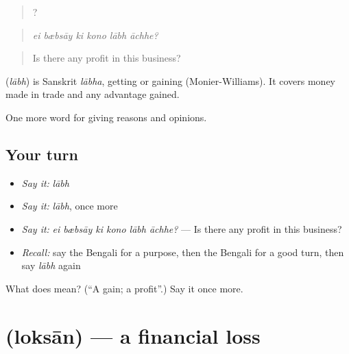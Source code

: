 \begin{quote}
     ?
\end{quote}

\begin{quote}
\emph{ei bæbsāy ki kono lābh āchhe?}
\end{quote}

\begin{quote}
Is there any profit in this business?
\end{quote}

\begin{cousinweb}
\textbf{} (\emph{lābh}) is Sanskrit \emph{lābha}, getting or gaining (Monier-Williams). It covers money made in trade and any advantage gained.
\end{cousinweb}

\begin{grammarlens}[title={What you've built}]
One more word for giving reasons and opinions.
\end{grammarlens}

\subsection*{Your turn}
\begin{itemize}
\raggedright
  \item \emph{Say it:} \emph{lābh}
  \item \emph{Say it:} \emph{lābh}, once more
  \item \emph{Say it:} \emph{ei bæbsāy ki kono lābh āchhe?} — Is there any profit in this business?
  \item \emph{Recall:} say the Bengali for a purpose, then the Bengali for a good turn, then say \emph{lābh} again
\end{itemize}

\begin{tcolorbox}[breakable,colback=teal!4,colframe=teal!35!black,title={Before you move on}]
What does  mean? (\textquotedblleft{}A gain; a profit\textquotedblright{}.) Say it once more.
\end{tcolorbox}
\section[\texorpdfstring{\bn{লোকসান} (loksān)}{লোকসান (loksān)}]{ (loksān) — a financial loss}

\label{lesson:BN-C331-loksan}




